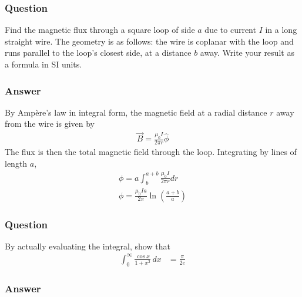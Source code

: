 \subsubsection{Question}

Find the magnetic flux through a square loop of side $a$ due to current $I$ in
a long straight wire. The geometry is as follows: the wire is coplanar with the
loop and runs parallel to the loop's closest side, at a distance $b$ away.
Write your result as a formula in SI units.

\subsubsection{Answer}

By Ampère's law in integral form, the magnetic field at a radial distance $r$
away from the wire is given by
\begin{align*}
    \vec B = \frac{{\mu}_0I}{2{\pi} r} \hat \phi 
\end{align*}
The flux is then the total magnetic field through the loop. Integrating by
lines of length $a$,
\begin{align*}
    \phi  = a \int_b^{a+b} \frac{{\mu}_0I}{2{\pi} r} dr \\
    \boxed{\phi  = \frac{{\mu}_0Ia}{2{\pi}}\ln(\frac{a+b}{a})}
\end{align*}

\subsubsection{Question}

By actually evaluating the integral, show that
\begin{align*}
    \int_0^\infty  \frac{\cos x}{1 + x^2}\,dx &= \frac{{\pi}}{2e}
\end{align*}

\subsubsection{Answer}

